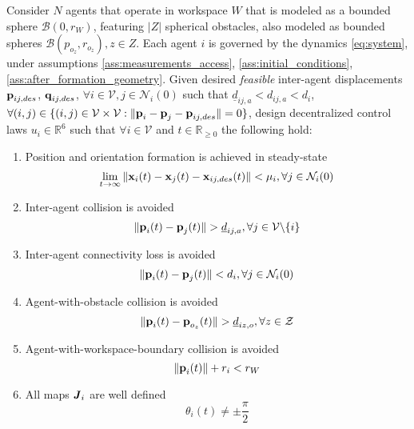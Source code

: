 \begin{bg_box}
\begin{problem}
	Consider $N$ agents that operate in workspace $W$ that is modeled as a bounded
  sphere $\mathcal{B}(0,r_W)$, featuring $|Z|$ spherical obstacles, also modeled
  as bounded spheres $\mathcal{B}(p_{o_z}, r_{o_z}), z \in Z$.
  Each agent $i$ is governed by the dynamics \eqref{eq:system}, under
  assumptions \ref{ass:measurements_access}, \ref{ass:initial_conditions},
  \ref{ass:after_formation_geometry}. Given desired \textit{feasible}
  inter-agent displacements $\bm{\mathbf{p}}_{ij,des}$, $\bm{\mathbf{q}}_{ij,des}$,
  $\forall i \in \mathcal{V}, j \in \mathcal{N}_i(0)$ such that
  $\underline{d}_{ij,a} < d_{ij,a} < d_i$, $\forall (i,j) \in
  \{(i,j) \in \mathcal{V} \times \mathcal{V}:
  \|\bm{\mathbf{p}}_i - \bm{\mathbf{p}}_j - \bm{\mathbf{p}}_{ij,des}\| = 0\}$,
  design decentralized control laws $u_i \in \mathbb{R}^6$ such that
  $\forall i \in \mathcal{V}$ and $t \in \mathbb{R}_{\geq 0}$ the following
  hold:

  \begin{enumerate}

    \item Position and orientation formation is achieved in steady-state
      $$\lim_{t \to \infty} \|\bm{\mathbf{x}}_i(t) - \bm{\mathbf{x}}_j(t) - \bm{\mathbf{x}}_{ij,des}(t)\| < \mu_i,
        \forall j \in \mathcal{N}_i(0)$$

    \item Inter-agent collision is avoided
      $$\|\bm{\mathbf{p}}_i(t) - \bm{\mathbf{p}}_j(t)\| > \underline{d}_{ij,a},
      \forall j \in \mathcal{V} \backslash \{i\}$$

    \item Inter-agent connectivity loss is avoided
      $$\|\bm{\mathbf{p}}_i(t) - \bm{\mathbf{p}}_j(t)\| < d_i,
      \forall j \in \mathcal{N}_i(0)$$

    \item Agent-with-obstacle collision is avoided
      $$\|\bm{\mathbf{p}}_i(t) - \bm{\mathbf{p}}_{o_z}(t)\| > \underline{d}_{iz,o},
      \forall z \in \mathcal{Z}$$

    \item Agent-with-workspace-boundary collision is avoided
      $$\|\bm{\mathbf{p}}_i(t)\| + r_i < r_W$$

    \item All maps $\bm{\mathit{J}}_i$ are well defined
      $$\theta_i(t) \ne \pm \frac{\pi}{2}$$

  \end{enumerate}
\label{problem}
\end{problem}
\end{bg_box}
